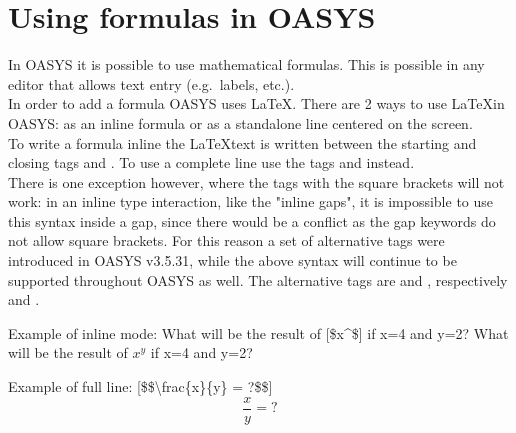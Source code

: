 \documentclass[12pt]{article} %
\newenvironment{keyword}{\leavevmode\color{magenta}}{}
\newenvironment{properties}
	{
    	\footnotesize\renewcommand{\arraystretch}{1.30}
  		\renewcommand{\tabcolsep}{0pt}
   		\begin{longtable}{>{\begin{keyword}}p{3.1cm}<{\end{keyword}}p{13.9cm}}
    	\hline
	}
	{
		\hline\end{longtable}\vspace{5mm}
	}
\begin{document}
%
%
%

\section{Using formulas in OASYS}\label{sec:using-formulas-in-oasys}

In OASYS it is possible to use mathematical formulas.
This is possible in any editor that allows text entry (e.g.\ labels, etc.).\\

In order to add a formula OASYS uses \LaTeX.
There are 2 ways to use \LaTeX in OASYS: as an inline formula or as a standalone line centered on the screen.\\

To write a formula inline the \LaTeX text is written between the starting and closing tags \kw{[\$} and \kw{\$]}.
To use a complete line use the tags \kw{[\$\$} and \kw{\$\$]} instead.\\

There is one exception however, where the tags with the square brackets will not work: in an inline type interaction, like the "inline gaps", it is impossible to use this syntax inside a gap, since there would be a conflict as the gap keywords do not allow square brackets. For this reason a set of alternative tags were introduced in OASYS v3.5.31, while the above syntax will continue to be supported throughout OASYS as well. The alternative tags are \kw{\{\$} and \kw{\$\}}, respectively \kw{\{\$\$} and \kw{\$\$\}}.\\

\begin{exampleResultBox}{Example of inline mode:}
What will be the result of [\$x\^\@y\$] if x=4 and y=2?
\tcblower
{}
What will be the result of $x^y$ if x=4 and y=2?
\end{exampleResultBox}

\vspace{1cm}

\begin{exampleResultBox}{Example of full line:}
[\$\$\textbackslash frac\{x\}\{y\} = ?\$\$]
\tcblower
{}
\[\frac{x}{y} = ?\]
\end{exampleResultBox}
\end{document}
